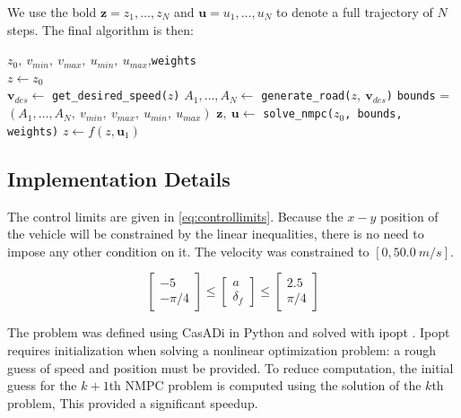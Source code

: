 \documentclass[conference]{IEEEtran}
\begin{document}
We use the bold $\textbf{z} = z_1,\dots,z_N$ and $\textbf{u} = u_1,\dots,u_N$ to denote a full trajectory of $N$ steps. The final algorithm is then:
\begin{algorithmic}
\REQUIRE $z_0,\ v_{min},\ v_{max},\ u_{min},\ u_{max}$,\texttt{weights}\\
\STATE $z \leftarrow z_0$
\\
\WHILE \TRUE
\STATE $\textbf{v}_{des} \leftarrow$ \texttt{get\_desired\_speed(}$z$\texttt{)}
\STATE $A_1,\dots,A_N\leftarrow $  \texttt{generate\_road(}$z,\ \textbf{v}_{des}$\texttt{)}
\STATE \texttt{bounds} = $(A_1,\dots,A_N,\ v_{min},\ v_{max},\ u_{min},\ u_{max})$
\STATE $\textbf{z},\ \textbf{u}\leftarrow$ \texttt{solve\_nmpc(}$z_0$\texttt{, bounds, weights)}
\STATE $z \leftarrow f(z, \textbf{u}_1)$
\ENDWHILE
\end{algorithmic}


\subsection{Implementation Details}

The control limits are given in \eqref{eq:controllimits}. Because the $x-y$ position of the vehicle will be constrained by the linear inequalities, there is no need to impose any other condition on it. The velocity was constrained to $[0, 50.0\ m/s]$.

\begin{equation}
\begin{bmatrix}
-5\\-\pi/4
\end{bmatrix} \leq \begin{bmatrix}
a\\\delta_f
\end{bmatrix} \leq \begin{bmatrix}
2.5\\\pi/4
\end{bmatrix}
\label{eq:controllimits}
\end{equation}

The problem was defined using CasADi in Python and solved with ipopt \cite{Casadi} \cite{ipopt}. Ipopt requires initialization when solving a nonlinear optimization problem: a rough guess of speed and position must be provided. To reduce computation, the initial guess for the $k+1$th NMPC problem is computed using the solution of the $k$th problem, %
This provided a significant speedup.
\end{document}
